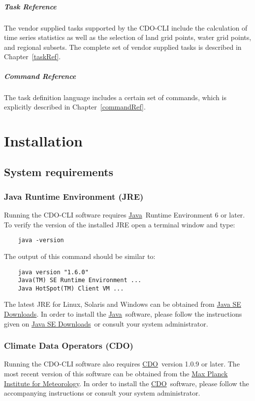 \documentclass[
square
,pdftex
]{refrep}
\newcommand{\cdo}{\href{http://www.mpimet.mpg.de/cdo/}{CDO}}
\newcommand{\java}{\href{http://java.sun.com/}{Java}}
\newcommand{\mpimet}{\href{http://www.mpimet.mpg.de/}
    {Max Planck Institute for Meteorology}}
\newcommand{\javase}{\href{http://java.sun.com/javase/downloads/}
    {Java SE Downloads}}
\begin{document}
\paragraph{Task Reference}
The vendor supplied tasks supported by the CDO-CLI include the calculation of
time series statistics as well as the selection of land grid points, water grid
points, and regional subsets. The complete set of vendor supplied tasks is
described in Chapter~\ref{taskRef}.

\paragraph{Command Reference}
The task definition language includes a certain set of commands, which is
explicitly described in Chapter~\ref{commandRef}.


\chapter{Installation}
\label{installation}

\section{System requirements}

\subsection{Java Runtime Environment (JRE)}
Running the CDO-CLI software requires \java\ Runtime Environment 6 or later. To
verify the version of the installed JRE open a terminal window and type:

\begin{verbatim}
    java -version
\end{verbatim}

The output of this command should be similar to:

\begin{verbatim}
    java version "1.6.0"
    Java(TM) SE Runtime Environment ...
    Java HotSpot(TM) Client VM ...
\end{verbatim}

The latest JRE for Linux, Solaris and Windows can be obtained from \javase. In
order to install the \java\ software, please follow the instructions given on
\javase\ or consult your system administrator.

\subsection{Climate Data Operators (CDO)}
Running the CDO-CLI software also requires \cdo\ version 1.0.9 or later. The
most recent version of this software can be obtained from the \mpimet. In order
to install the \cdo\ software, please follow the accompanying instructions or
consult your system administrator.
\end{document}
